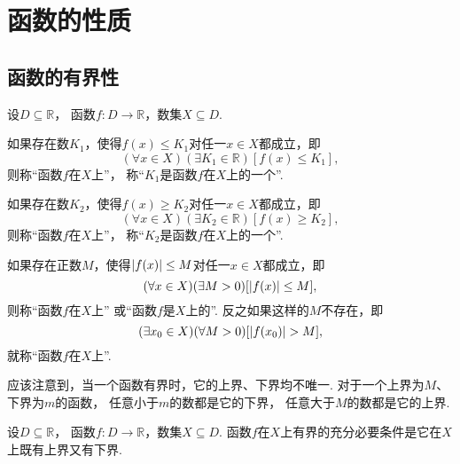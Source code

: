 \section{函数的性质}
\subsection{函数的有界性}
\begin{definition}\label{definition:函数.函数的有界性}
设\(D\subseteq\mathbb{R}\)，
函数\(f\colon D\to\mathbb{R}\)，数集\(X \subseteq D\).

如果存在数\(K_1\)，使得\(f(x) \leq K_1\)对任一\(x \in X\)都成立，即\[
	(\forall x \in X)
	(\exists K_1 \in \mathbb{R})
	[f(x) \leq K_1],
\]
则称“函数\(f\)在\(X\)上”，
称“\(K_1\)是函数\(f\)在\(X\)上的一个”.

如果存在数\(K_2\)，使得\(f(x) \geq K_2\)对任一\(x \in X\)都成立，即\[
	(\forall x \in X)
	(\exists K_2 \in \mathbb{R})
	[f(x) \geq K_2],
\]
则称“函数\(f\)在\(X\)上”，
称“\(K_2\)是函数\(f\)在\(X\)上的一个”.

如果存在正数\(M\)，使得\(\abs{f(x)} \leq M\)对任一\(x \in X\)都成立，即\[
	(\forall x \in X)
	(\exists M>0)[
		\abs{f(x)} \leq M
	],
\]
则称“函数\(f\)在\(X\)上”
或“函数\(f\)是\(X\)上的”.
反之如果这样的\(M\)不存在，即\[
	(\exists x_0 \in X)
	(\forall M>0)[
		\abs{f(x_0)} > M
	],
\]
就称“函数\(f\)在\(X\)上”.
\end{definition}

应该注意到，当一个函数有界时，它的上界、下界均不唯一.
对于一个上界为\(M\)、下界为\(m\)的函数，
任意小于\(m\)的数都是它的下界，
任意大于\(M\)的数都是它的上界.

\begin{theorem}
设\(D\subseteq\mathbb{R}\)，
函数\(f\colon D\to\mathbb{R}\)，数集\(X \subseteq D\).
函数\(f\)在\(X\)上有界的充分必要条件是它在\(X\)上既有上界又有下界.
\end{theorem}

